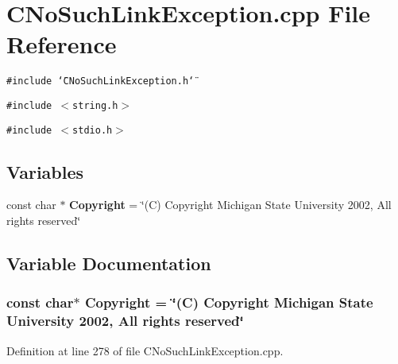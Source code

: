 \section{CNo\-Such\-Link\-Exception.cpp File Reference}
\label{CNoSuchLinkException_8cpp}
{\tt \#include \char`\"{}CNo\-Such\-Link\-Exception.h\char`\"{}}\par
{\tt \#include $<$string.h$>$}\par
{\tt \#include $<$stdio.h$>$}\par
\subsection*{Variables}
\begin{CompactItemize}
\item 
const char $\ast$ {\bf Copyright} = \char`\"{}(C) Copyright Michigan State University 2002, All rights reserved\char`\"{}
\end{CompactItemize}


\subsection{Variable Documentation}
\subsubsection{\setlength{\rightskip}{0pt plus 5cm}const char$\ast$ Copyright = \char`\"{}(C) Copyright Michigan State University 2002, All rights reserved\char`\"{}\hspace{0.3cm}{\tt  [static]}}\label{CNoSuchLinkException_8cpp_a0}




Definition at line 278 of file CNo\-Such\-Link\-Exception.cpp.
